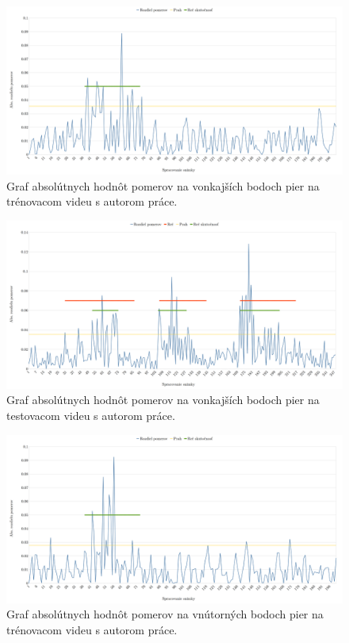 \begin{figure}[H]
	\begin{center}
		\includegraphics[width=\textwidth]{pics/vonTreningRiso.png}
		\caption{Graf absolútnych hodnôt pomerov na vonkajších bodoch pier na trénovacom videu s autorom práce.}
		\label{pic-vonTreningRiso}
	\end{center}
\end{figure}

\begin{figure}[H]
	\begin{center}
		\includegraphics[width=\textwidth]{pics/vonTestRiso.png}
		\caption{Graf absolútnych hodnôt pomerov na vonkajších bodoch pier na testovacom videu s autorom práce.}
		\label{pic-vonTestRiso}
	\end{center}
\end{figure}

\begin{figure}[H]
	\begin{center}
		\includegraphics[width=\textwidth]{pics/vnutriTreningRiso.png}
		\caption{Graf absolútnych hodnôt pomerov na vnútorných bodoch pier na trénovacom videu s autorom práce.}
		\label{pic-vnutriTreningRiso}
	\end{center}
\end{figure}


